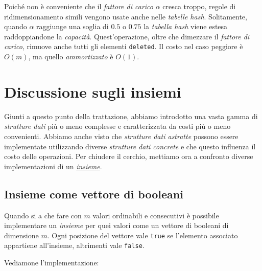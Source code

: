 \begin{note}
    Poiché non è conveniente che il \emph{fattore di carico} $\alpha$ cresca
    troppo, regole di ridimensionamento simili vengono usate anche nelle
    \emph{tabelle hash}. Solitamente, quando $\alpha$ raggiunge una soglia
    di $0.5$ o $0.75$ la \emph{tabella hash} viene estesa raddoppiandone la
    \emph{capacità}.  Quest'operazione, oltre che dimezzare il \emph{fattore di
    carico}, rimuove anche tutti gli elementi \texttt{deleted}. Il costo nel
    caso peggiore è $O(m)$, ma quello \emph{ammortizzato} è $O(1)$.
\end{note}

\section{Discussione sugli insiemi}
Giunti a questo punto della trattazione, abbiamo introdotto una vasta gamma di
\emph{strutture dati} più o meno complesse e caratterizzata da costi più o meno
convenienti. Abbiamo anche visto che \emph{strutture dati astratte} possono
essere implementate utilizzando diverse \emph{strutture dati concrete} e che
questo influenza il costo delle operazioni. Per chiudere il cerchio, mettiamo ora
a confronto diverse implementazioni di un \emph{\hyperref[def:28]{insieme}}.

\subsection{Insieme come vettore di booleani}
Quando si a che fare con $m$ valori ordinabili e consecutivi è possibile
implementare un \emph{insieme} per quei valori come un vettore di booleani di
dimensione $m$. Ogni posizione del vettore vale \texttt{true} se l'elemento
associato appartiene all'insieme, altrimenti vale \texttt{false}.

\bigskip\noindent
Vediamone l'implementazione:

